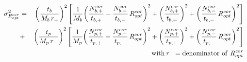 


\begin{eqnarray*}
  \sigma_{R_{opt}^{cor}}^2 & = & \,
         {\left( \frac{t_b} {M_b \, r_{-}} \right)}^2
         \left[ \frac{1}{M_b}
         { \left( \frac{N_{b,+}^{cor}} {t_{b,+}} - \frac{N_{b,-}^{cor}} {t_{b,-}}
         \, R_{opt}^{cor} \right) }^2 +
         {\left( \frac{N_{b,+}^{cor}} {t_{b,+}} \right)}^2 +
         {\left( \frac{N_{b,-}^{cor}} {t_{b,-}}\,R_{opt}^{cor} \right)}^2
         \right] \\
         & + & 
         {\left( \frac{t_p} {M_p \, r_{-}} \right)}^2
         \left[ \frac{1}{M_p}
         { \left( \frac{N_{p,+}^{cor}} {t_{p,+}} - \frac{N_{p,-}^{cor}} {t_{p,-}}
         \, R_{opt}^{cor} \right) }^2
          + 
         {\left( \frac{N_{p,+}^{cor}} {t_{p,+}} \right) }^2 +
         {\left( \frac{N_{p,-}^{cor}} {t_{p,-}}\,R_{opt}^{cor} \right)}^2
         \right] \\
         & \, & \mathrm{with \, {\it r_{-}} = 
            denominator \ of \ {\it R_{opt}^{cor}}}
\end{eqnarray*}

